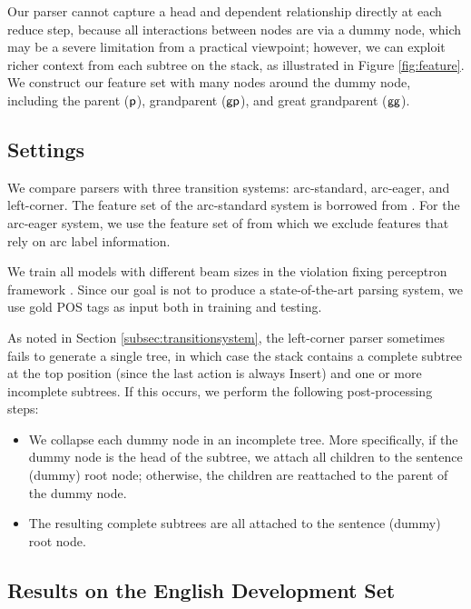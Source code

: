 \documentclass[english]{jnlp_1.4}
\begin{document}
Our parser cannot capture a head and dependent relationship directly at each reduce step, because all interactions between nodes are via a dummy node, which may be a severe limitation from a practical viewpoint;
however, we can exploit richer context from each subtree on the stack, as illustrated in Figure \ref{fig:feature}.
We construct our feature set with many nodes around the dummy node, including the parent (${\sf p}$), grandparent (${\sf gp}$), and great grandparent (${\sf gg}$).


\subsection{Settings}
\label{sec:exp:setting}

We compare parsers with three transition systems: arc-standard, arc-eager, and left-corner.
The feature set of the arc-standard system is borrowed from .
For the arc-eager system, we use the feature set of  from which we exclude features that rely on arc label information.

We train all models with different beam sizes in the violation fixing perceptron framework \cite{huang-fayong-guo:2012:NAACL-HLT}.
Since our goal is not to produce a state-of-the-art parsing system, we use gold POS tags as input both in training and testing.

As noted in Section \ref{subsec:transitionsystem}, the left-corner parser sometimes fails to generate a single tree, in which case the stack contains a complete subtree at the top position (since the last action is always {\sc Insert}) and one or more incomplete subtrees.
If this occurs, we perform the following post-processing steps:
\begin{itemize}
 \item We collapse each dummy node in an incomplete tree. More specifically, if the dummy node is the head of the subtree, we attach all children to the sentence (dummy) root node; otherwise, the children are reattached to the parent of the dummy node.
 \item The resulting complete subtrees are all attached to the sentence (dummy) root node.
\end{itemize}


\subsection{Results on the English Development Set}
\end{document}
